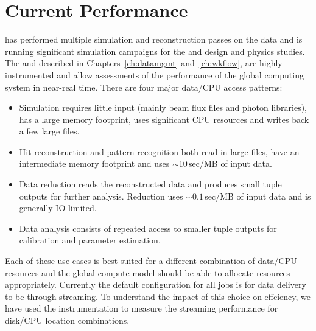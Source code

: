 \documentclass[../main-v1.tex]{subfiles}
\begin{document}
\section{Current Performance}\label{ch:model:perf} %

 has performed multiple simulation and reconstruction passes on the  data and is running significant simulation campaigns for the  and  design and physics studies. The  and  described in Chapters~\ref{ch:datamgmt} and~\ref{ch:wkflow}, are highly instrumented and allow assessments of the performance of the global computing system in near-real time.  There are four major data/CPU access patterns:
\begin{itemize}
    \item Simulation requires little input (mainly beam flux files and photon libraries),  has a large memory footprint, uses significant CPU resources and writes back a few large files.
    \item Hit reconstruction and pattern recognition both read in large files, have an intermediate memory footprint and uses $\sim$10\,sec/MB of input data.  
    \item Data reduction reads the reconstructed data and produces small tuple outputs for further analysis.  Reduction uses $\sim0.1$\,sec/MB of input data and is generally IO limited.
    \item Data analysis consists of repeated access to smaller tuple outputs for calibration and parameter estimation.
\end{itemize}

Each of these use cases is best suited for a different combination of data/CPU resources and the global compute model should be able to allocate resources appropriately.  Currently the default configuration for all  jobs is for data delivery to be through  streaming. To understand the impact of this choice on effciency, we have used the  instrumentation to measure the  streaming performance for disk/CPU location combinations. 
\end{document}
